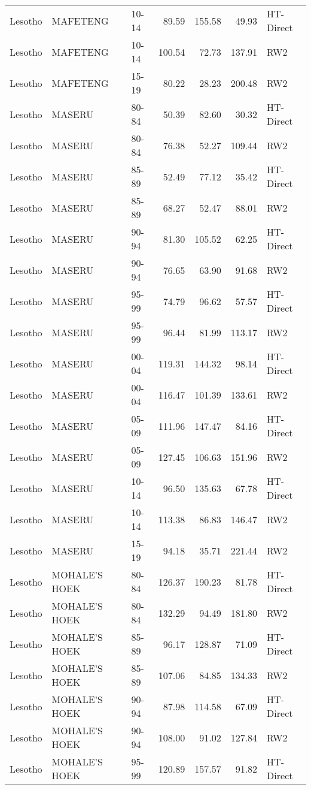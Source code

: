 \begin{longtable}{lllrrrl}
  Lesotho & MAFETENG & 10-14 & 89.59 & 155.58 & 49.93 & HT-Direct \\ 
  Lesotho & MAFETENG & 10-14 & 100.54 & 72.73 & 137.91 & RW2 \\ 
  Lesotho & MAFETENG & 15-19 & 80.22 & 28.23 & 200.48 & RW2 \\ 
  Lesotho & MASERU & 80-84 & 50.39 & 82.60 & 30.32 & HT-Direct \\ 
  Lesotho & MASERU & 80-84 & 76.38 & 52.27 & 109.44 & RW2 \\ 
  Lesotho & MASERU & 85-89 & 52.49 & 77.12 & 35.42 & HT-Direct \\ 
  Lesotho & MASERU & 85-89 & 68.27 & 52.47 & 88.01 & RW2 \\ 
  Lesotho & MASERU & 90-94 & 81.30 & 105.52 & 62.25 & HT-Direct \\ 
  Lesotho & MASERU & 90-94 & 76.65 & 63.90 & 91.68 & RW2 \\ 
  Lesotho & MASERU & 95-99 & 74.79 & 96.62 & 57.57 & HT-Direct \\ 
  Lesotho & MASERU & 95-99 & 96.44 & 81.99 & 113.17 & RW2 \\ 
  Lesotho & MASERU & 00-04 & 119.31 & 144.32 & 98.14 & HT-Direct \\ 
  Lesotho & MASERU & 00-04 & 116.47 & 101.39 & 133.61 & RW2 \\ 
  Lesotho & MASERU & 05-09 & 111.96 & 147.47 & 84.16 & HT-Direct \\ 
  Lesotho & MASERU & 05-09 & 127.45 & 106.63 & 151.96 & RW2 \\ 
  Lesotho & MASERU & 10-14 & 96.50 & 135.63 & 67.78 & HT-Direct \\ 
  Lesotho & MASERU & 10-14 & 113.38 & 86.83 & 146.47 & RW2 \\ 
  Lesotho & MASERU & 15-19 & 94.18 & 35.71 & 221.44 & RW2 \\ 
  Lesotho & MOHALE'S HOEK & 80-84 & 126.37 & 190.23 & 81.78 & HT-Direct \\ 
  Lesotho & MOHALE'S HOEK & 80-84 & 132.29 & 94.49 & 181.80 & RW2 \\ 
  Lesotho & MOHALE'S HOEK & 85-89 & 96.17 & 128.87 & 71.09 & HT-Direct \\ 
  Lesotho & MOHALE'S HOEK & 85-89 & 107.06 & 84.85 & 134.33 & RW2 \\ 
  Lesotho & MOHALE'S HOEK & 90-94 & 87.98 & 114.58 & 67.09 & HT-Direct \\ 
  Lesotho & MOHALE'S HOEK & 90-94 & 108.00 & 91.02 & 127.84 & RW2 \\ 
  Lesotho & MOHALE'S HOEK & 95-99 & 120.89 & 157.57 & 91.82 & HT-Direct \\ 

\end{longtable}
